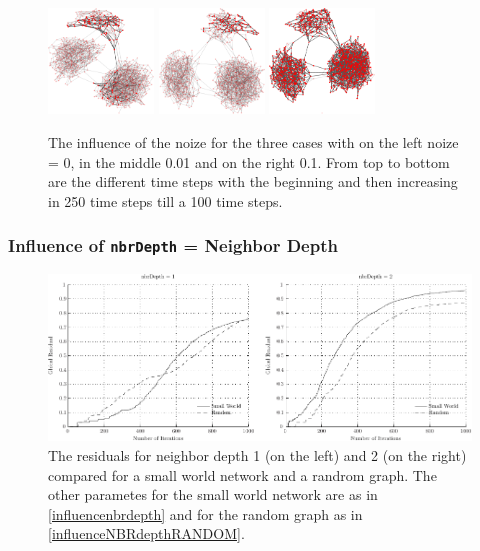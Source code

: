 \begin{figure}
\includegraphics[width=0.25\textwidth]{batchRun__kHalf=2-2-2_maxUpdate=0.02_noize=0_nbrDepth=1/network1000-crop.pdf}
\hfill
\includegraphics[width=0.25\textwidth]{batchRun__kHalf=2-2-2_maxUpdate=0.02_noize=0.01_nbrDepth=1/network1000-crop.pdf}
\hfill
\includegraphics[width=0.25\textwidth]{batchRun__kHalf=2-2-2_maxUpdate=0.02_noize=0.1_nbrDepth=1/network1000-crop.pdf}

\caption{The influence of the noize for the three cases with on the left noize = 0, in the middle 0.01 and on the right 0.1. From top to bottom are the different time steps with the beginning and then increasing in 250 time steps till a 100 time steps.}
\label{influencenoize}
\end{figure}



\subsubsection{Influence of \texttt{nbrDepth} = Neighbor Depth}
\label{sec:nbrDepth}

\begin{figure}
\centering
\includegraphics[width= \textwidth]{influenceOfNbrDepth/influenceNbrDepth.pdf}
\caption{The residuals for neighbor depth 1 (on the left) and 2 (on the right) compared for a small world network and a randrom graph. The other parametes for the small world network are as in \ref{influencenbrdepth} and for the random graph as in \ref{influenceNBRdepthRANDOM}.}
\label{residualNBRdepth}
\end{figure}

